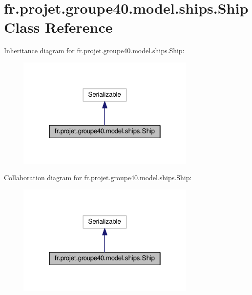 \hypertarget{classfr_1_1projet_1_1groupe40_1_1model_1_1ships_1_1_ship}{}\section{fr.\+projet.\+groupe40.\+model.\+ships.\+Ship Class Reference}
\label{classfr_1_1projet_1_1groupe40_1_1model_1_1ships_1_1_ship}


Inheritance diagram for fr.\+projet.\+groupe40.\+model.\+ships.\+Ship\+:\nopagebreak
\begin{figure}[H]
\begin{center}
\leavevmode
\includegraphics[width=250pt]{classfr_1_1projet_1_1groupe40_1_1model_1_1ships_1_1_ship__inherit__graph}
\end{center}
\end{figure}


Collaboration diagram for fr.\+projet.\+groupe40.\+model.\+ships.\+Ship\+:\nopagebreak
\begin{figure}[H]
\begin{center}
\leavevmode
\includegraphics[width=250pt]{classfr_1_1projet_1_1groupe40_1_1model_1_1ships_1_1_ship__coll__graph}
\end{center}
\end{figure}
